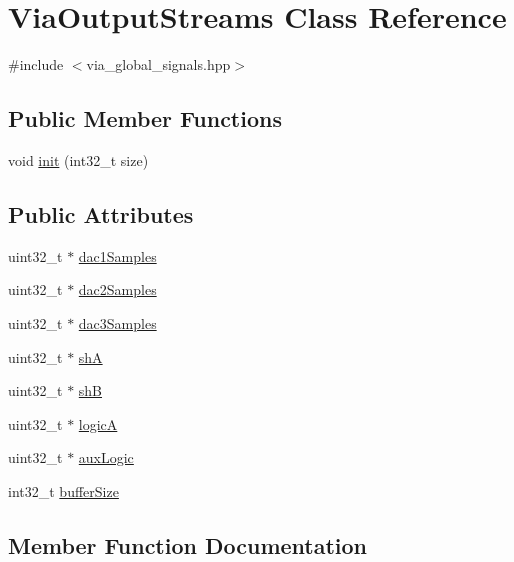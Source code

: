 \hypertarget{class_via_output_streams}{}\section{Via\+Output\+Streams Class Reference}
\label{class_via_output_streams}


{\ttfamily \#include $<$via\+\_\+global\+\_\+signals.\+hpp$>$}

\subsection*{Public Member Functions}
\begin{DoxyCompactItemize}
\item 
void \mbox{\hyperlink{class_via_output_streams_a7738f6a529d436465e4700d3ef6454a6}{init}} (int32\+\_\+t size)
\end{DoxyCompactItemize}
\subsection*{Public Attributes}
\begin{DoxyCompactItemize}
\item 
uint32\+\_\+t $\ast$ \mbox{\hyperlink{class_via_output_streams_ab2b0602b1fbb9e7725f6c3cc69cb6d37}{dac1\+Samples}}
\item 
uint32\+\_\+t $\ast$ \mbox{\hyperlink{class_via_output_streams_a3408c6a81975bd07bdb641a81a915628}{dac2\+Samples}}
\item 
uint32\+\_\+t $\ast$ \mbox{\hyperlink{class_via_output_streams_a6a03d0dcf662d510e8b0c1388a83be9b}{dac3\+Samples}}
\item 
uint32\+\_\+t $\ast$ \mbox{\hyperlink{class_via_output_streams_a422c40781977290f2a00b82695a0c4a8}{shA}}
\item 
uint32\+\_\+t $\ast$ \mbox{\hyperlink{class_via_output_streams_a26a688fc61b28c641d9573f570674dd1}{shB}}
\item 
uint32\+\_\+t $\ast$ \mbox{\hyperlink{class_via_output_streams_a0f216015e97d55df00acb92dcd12d48e}{logicA}}
\item 
uint32\+\_\+t $\ast$ \mbox{\hyperlink{class_via_output_streams_afa52662b726a4805bf78134f758356d6}{aux\+Logic}}
\item 
int32\+\_\+t \mbox{\hyperlink{class_via_output_streams_a384858a953582f71570fee199450a070}{buffer\+Size}}
\end{DoxyCompactItemize}


\subsection{Member Function Documentation}
\mbox{\label{class_via_output_streams_a7738f6a529d436465e4700d3ef6454a6}} 
